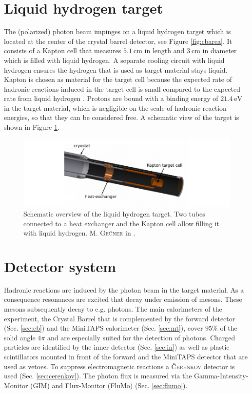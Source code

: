 \section{Liquid hydrogen target}
\label{sec:tar}
The (polarized) photon beam impinges on a liquid hydrogen target \cite{hammannphd} which is located at the center of the crystal barrel detector, see Figure \ref{fig:cbarea}. It consists of a Kapton cell that measures $\SI{5.1}{\centi\m}$ in length and $\SI{3}{\centi\m}$ in diameter which is filled with liquid hydrogen. A separate cooling circuit with liquid hydrogen ensures the hydrogen that is used as target material stays liquid. Kapton is chosen as material for the target cell because the expected rate of hadronic reactions induced in the target cell is small compared to the expected rate from liquid hydrogen \cite{hammannphd}. Protons are bound with a binding energy of $\SI{21.4}{\eV}$ in the target material, which is negligible on the scale of hadronic reaction energies, so that they can be considered free. A schematic view of the target is shown in Figure \ref{fig:target}.
\begin{figure}[htbp]
	\centering
	\includegraphics[width=\linewidth]{figs/Target.pdf}
	\caption{Schematic overview of the liquid hydrogen target. Two tubes connected to a heat exchanger and the Kapton cell allow filling it with liquid hydrogen. \textsc{M. Grüner} in \cite{farahphd}.}
	\label{fig:target}
\end{figure}
\section{Detector system}
\label{sec:cal}
Hadronic reactions are induced by the photon beam in the target material. As a consequence resonances are excited that decay under emission of mesons. These mesons subsequently decay to e.g. photons. The main calorimeters of the experiment, the Crystal Barrel that is complemented by the forward detector (Sec. \ref{sec:cb}) and the MiniTAPS calorimeter (Sec. \ref{sec:mt}), cover $95\%$ of the solid angle $4\pi$ and are especially suited for the detection of photons. Charged particles are identified by the inner detector (Sec. \ref{sec:in}) as well as plastic scintillators mounted in front of the forward and the MiniTAPS detector that are used as vetoes. To suppress electromagnetic reactions a \textsc{\v Cerenkov} detector is used (Sec. \ref{sec:cerenkov}). The photon flux is measured via the Gamma-Intensity-Monitor (GIM) and Flux-Monitor (FluMo) (Sec. \ref{sec:flumo}).
